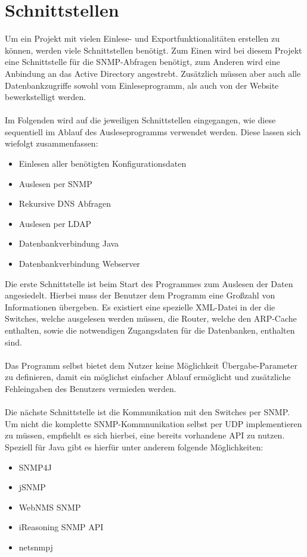 \section{Schnittstellen}
\label{sec:schnitt}

Um ein Projekt mit vielen Einlese- und Exportfunktionalitäten erstellen zu können, werden viele Schnittstellen benötigt.
Zum Einen wird bei diesem Projekt eine Schnittstelle für die SNMP-Abfragen benötigt, zum Anderen wird eine Anbindung an das Active Directory angestrebt. Zusätzlich müssen aber auch alle Datenbankzugriffe sowohl vom Einleseprogramm, als auch von der Website bewerkstelligt werden.\\\\
Im Folgenden wird auf die jeweiligen Schnittstellen eingegangen, wie diese sequentiell im Ablauf des Ausleseprogramms verwendet werden. Diese lassen sich wiefolgt zusammenfassen:
\begin{itemize}
\item Einlesen aller benötigten Konfigurationsdaten
\item Auslesen per SNMP
\item Rekursive DNS Abfragen
\item Auslesen per LDAP
\item Datenbankverbindung Java
\item Datenbankverbindung Webserver\\
\end{itemize}

Die erste Schnittstelle ist beim Start des Programmes zum Auslesen der Daten angesiedelt. Hierbei muss der Benutzer dem Programm eine Großzahl von Informationen übergeben.
Es existiert eine spezielle XML-Datei in der die Switches, welche ausgelesen werden müssen, die Router, welche den ARP-Cache enthalten, sowie die notwendigen Zugangsdaten für die Datenbanken, enthalten sind. \\\\
Das Programm selbst bietet dem Nutzer keine Möglichkeit Übergabe-Parameter zu definieren, damit ein möglichst einfacher Ablauf ermöglicht und zusätzliche Fehleingaben des Benutzers vermieden werden.\\\\
Die nächste Schnittstelle ist die Kommunikation mit den Switches per SNMP. Um nicht die komplette SNMP-Kommnunikation selbst per UDP implementieren zu müssen, empfiehlt es sich hierbei, eine bereits vorhandene API zu nutzen.
Speziell für Java gibt es hierfür unter anderem folgende Möglichkeiten:
\begin{itemize}
\item SNMP4J
\item jSNMP
\item WebNMS SNMP
\item iReasoning SNMP API
\item netsnmpj\\
\end{itemize}

